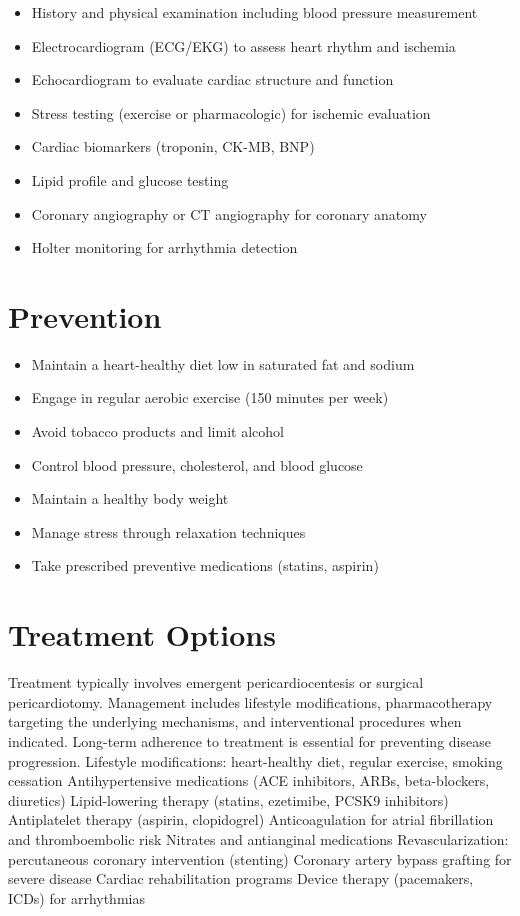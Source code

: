 \begin{itemize}[noitemsep]
  \item History and physical examination including blood pressure measurement
  \item Electrocardiogram (ECG/EKG) to assess heart rhythm and ischemia
  \item Echocardiogram to evaluate cardiac structure and function
  \item Stress testing (exercise or pharmacologic) for ischemic evaluation
  \item Cardiac biomarkers (troponin, CK-MB, BNP)
  \item Lipid profile and glucose testing
  \item Coronary angiography or CT angiography for coronary anatomy
  \item Holter monitoring for arrhythmia detection
\end{itemize}
\section{Prevention}
\begin{itemize}[noitemsep]
  \item Maintain a heart-healthy diet low in saturated fat and sodium
  \item Engage in regular aerobic exercise (150 minutes per week)
  \item Avoid tobacco products and limit alcohol
  \item Control blood pressure, cholesterol, and blood glucose
  \item Maintain a healthy body weight
  \item Manage stress through relaxation techniques
  \item Take prescribed preventive medications (statins, aspirin)
\end{itemize}
\section{Treatment Options}
Treatment typically involves emergent pericardiocentesis or surgical pericardiotomy. Management includes lifestyle modifications, pharmacotherapy targeting the underlying mechanisms, and interventional procedures when indicated. Long-term adherence to treatment is essential for preventing disease progression. Lifestyle modifications: heart-healthy diet, regular exercise, smoking cessation Antihypertensive medications (ACE inhibitors, ARBs, beta-blockers, diuretics) Lipid-lowering therapy (statins, ezetimibe, PCSK9 inhibitors) Antiplatelet therapy (aspirin, clopidogrel) Anticoagulation for atrial fibrillation and thromboembolic risk Nitrates and antianginal medications Revascularization: percutaneous coronary intervention (stenting) Coronary artery bypass grafting for severe disease Cardiac rehabilitation programs Device therapy (pacemakers, ICDs) for arrhythmias

